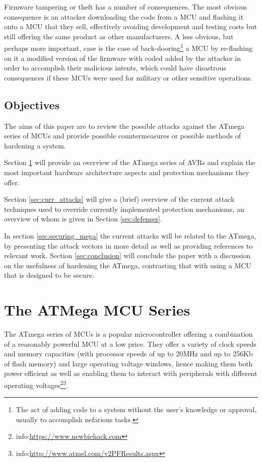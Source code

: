 \documentclass[12pt,a4paper,twocolumn]{article}
\begin{document}
	Firmware tampering or theft has a number of consequences. The most obvious consequence is an attacker downloading the code from a MCU and flashing it onto a MCU that they sell, effectively avoiding development and testing costs but still offering the same product as other manufacturers. A less obvious, but perhaps more important, case is the case of back-dooring\footnote{The act of adding code to a system without the user's knowledge or approval, usually to accomplish nefarious tasks.} a MCU by re-flashing on it a modified version of the firmware with coded added by the attacker in order to accomplish their malicious intents, which could have disastrous consequences if these MCUs were used for military or other sensitive operations. 

	\subsection{Objectives}
	The aims of this paper are to review the possible attacks against the ATmega series of MCUs and provide possible countermeasures or possible methods of hardening a system. 
	
	Section \ref{sec:atmega_overview} will provide an overview of the ATmega series of AVRs and explain the most important hardware architecture aspects and protection mechanisms they offer. 
	
	Section \ref{sec:curr_attacks} will give a (brief) overview of the current attack techniques used to override currently implemented protection mechanisms, an overview of whom is given in Section \ref{sec:defenses}. 
	
	In section \ref{sec:securing_mega} the current attacks will be related to the ATmega, by presenting the attack vectors in more detail as well as providing references to relevant work. Section \ref{sec:conclusion} will conclude the paper with a discussion on the usefulness of hardening the ATmega, contrasting that with using a MCU that is designed to be secure.
	
\section{The ATMega MCU Series}
\label{sec:atmega_overview}
	The ATmega series of MCUs is a popular microcontroller offering a combination of a reasonably powerful MCU at a low price. They offer a variety of clock speeds and memory capacities (with processor speeds of up to 20MHz and up to 256Kb of flash memory) and large operating voltage windows, hence making them both power efficient as well as enabling them to interact with peripherals with different operating voltages\footnote{info:\href{https://www.newbiehack.com/MicrocontrollersAlternativePowerSources.aspx}{https://www.newbiehack.com}}\footnote{info:\href{http://www.atmel.com/v2PFResults.aspx}{http://www.atmel.com/v2PFResults.aspx}}.
	
\end{document}
